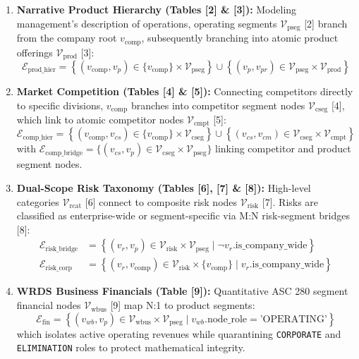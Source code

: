 \begin{enumerate}
    \item \textbf{Narrative Product Hierarchy (Tables [2] \& [3]):} Modeling management's description of operations, operating segments $\mathcal{V}_{\text{pseg}}$ [2] branch from the company root $v_{\text{comp}}$, subsequently branching into atomic product offerings $\mathcal{V}_{\text{prod}}$ [3]:
    \begin{equation}
        \mathcal{E}_{\text{prod\_hier}} = \left\{ (v_{\text{comp}}, v_p) \in \{v_{\text{comp}}\} \times \mathcal{V}_{\text{pseg}} \right\} \cup \left\{ (v_p, v_{pr}) \in \mathcal{V}_{\text{pseg}} \times \mathcal{V}_{\text{prod}} \right\}
    \end{equation}
    
    \item \textbf{Market Competition (Tables [4] \& [5]):} Connecting competitors directly to specific divisions, $v_{\text{comp}}$ branches into competitor segment nodes $\mathcal{V}_{\text{cseg}}$ [4], which link to atomic competitor nodes $\mathcal{V}_{\text{cmpt}}$ [5]:
    \begin{equation}
        \mathcal{E}_{\text{comp\_hier}} = \left\{ (v_{\text{comp}}, v_{cs}) \in \{v_{\text{comp}}\} \times \mathcal{V}_{\text{cseg}} \right\} \cup \left\{ (v_{cs}, v_{cm}) \in \mathcal{V}_{\text{cseg}} \times \mathcal{V}_{\text{cmpt}} \right\}
    \end{equation}
    with $\mathcal{E}_{\text{comp\_bridge}} = \{ (v_{cs}, v_p) \in \mathcal{V}_{\text{cseg}} \times \mathcal{V}_{\text{pseg}} \}$ linking competitor and product segment nodes.

    \item \textbf{Dual-Scope Risk Taxonomy (Tables [6], [7] \& [8]):} High-level categories $\mathcal{V}_{\text{rcat}}$ [6] connect to composite risk nodes $\mathcal{V}_{\text{risk}}$ [7]. Risks are classified as enterprise-wide or segment-specific via M:N risk-segment bridges [8]:
    \begin{align}
        \mathcal{E}_{\text{risk\_bridge}} &= \left\{ (v_r, v_p) \in \mathcal{V}_{\text{risk}} \times \mathcal{V}_{\text{pseg}} \mid \neg v_r.\text{is\_company\_wide} \right\} \\
        \mathcal{E}_{\text{risk\_corp}} &= \left\{ (v_r, v_{\text{comp}}) \in \mathcal{V}_{\text{risk}} \times \{v_{\text{comp}}\} \mid v_r.\text{is\_company\_wide} \right\}
    \end{align}

    \item \textbf{WRDS Business Financials (Table [9]):} Quantitative ASC 280 segment financial nodes $\mathcal{V}_{\text{wbus}}$ [9] map N:1 to product segments:
    \begin{equation}
        \mathcal{E}_{\text{fin}} = \left\{ (v_{wb}, v_p) \in \mathcal{V}_{\text{wbus}} \times \mathcal{V}_{\text{pseg}} \mid v_{wb}.\text{node\_role} = \text{'OPERATING'} \right\}
    \end{equation}
    which isolates active operating revenues while quarantining \texttt{CORPORATE} and \texttt{ELIMINATION} roles to protect mathematical integrity.
\end{enumerate}

